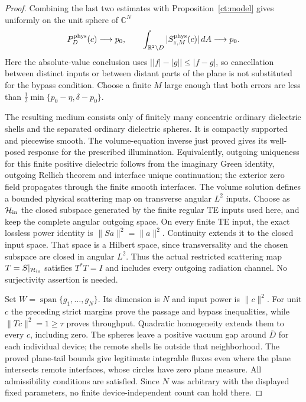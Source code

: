 \begin{proof}
Combining the last two estimates with Proposition~\ref{ct:model}
gives uniformly on the unit sphere of $\mathbb C^N$
\[
 P_D^{\rm phys}(c)\longrightarrow p_0,\qquad
 \int_{\mathbb R^2\setminus D}|S_{z,M}^{\rm phys}(c)|\,dA
       \longrightarrow p_0 .
\]
Here the absolute-value conclusion uses
$\bigl||f|-|g|\bigr|\leq|f-g|$, so cancellation between distinct
inputs or between distant parts of the plane is not substituted for
the bypass condition. Choose a finite $M$ large enough that both
errors are less than
$\tfrac12\min\{p_0-\eta,\delta-p_0\}$.

The resulting medium consists only of finitely many concentric
ordinary dielectric shells and the separated ordinary dielectric
spheres. It is compactly supported and piecewise smooth. The
volume-equation inverse just proved gives its well-posed response
for the prescribed illumination. Equivalently, outgoing uniqueness
for this finite positive dielectric follows from the imaginary
Green identity, outgoing Rellich theorem and interface unique
continuation; the exterior zero field propagates through the finite
smooth interfaces. The volume solution defines a bounded physical
scattering map on transverse angular $L^2$ inputs. Choose as
$\mathcal H_{\rm in}$ the closed subspace generated by the finite regular
TE inputs used here, and keep the complete angular outgoing space.
On every finite TE input, the exact lossless power identity is
$\|Sa\|^2=\|a\|^2$. Continuity extends it to the closed input space.
That space is a Hilbert space, since transversality and the chosen
subspace are closed in angular $L^2$. Thus the actual restricted
scattering map $T=S|_{\mathcal H_{\rm in}}$ satisfies $T^*T=I$ and
includes every outgoing radiation channel. No surjectivity assertion
is needed.

Set $W=\operatorname{span}\{g_1,\ldots,g_N\}$. Its dimension is
$N$ and input power is $\|c\|^2$. For unit $c$ the preceding
strict margins prove the passage and bypass inequalities, while
$\|Tc\|^2=1\geq\tau$ proves throughput. Quadratic homogeneity
extends them to every $c$, including zero. The spheres leave a
positive vacuum gap around $\overline D$ for each individual
device; the remote shells lie outside that neighborhood. The
proved plane-tail bounds give legitimate integrable fluxes even
where the plane intersects remote interfaces, whose circles have
zero plane measure. All admissibility conditions are satisfied.
Since $N$ was arbitrary with the displayed fixed parameters,
no finite device-independent count can hold there.
\end{proof}

